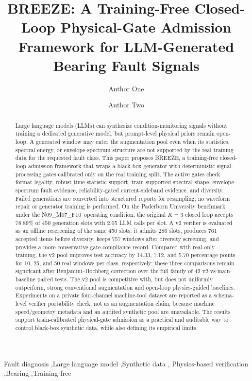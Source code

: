 \documentclass[review,3p,times]{elsarticle}
\newcommand{\breeze}{BREEZE}
\newcommand{\pucond}{N09\_M07\_F10}
\begin{document}
\begin{frontmatter}

\title{\breeze: A Training-Free Closed-Loop Physical-Gate Admission Framework
for LLM-Generated Bearing Fault Signals}

\author[a]{Author One}
\author[a]{Author Two}

\begin{abstract}
Large language models (LLMs) can synthesize condition-monitoring signals
without training a dedicated generative model, but prompt-level physical priors
remain open-loop. A generated window may enter the augmentation pool even when
its statistics, spectral energy, or envelope-spectrum structure are not
supported by the real training data for the requested fault class. This paper
proposes \breeze, a training-free closed-loop admission framework that wraps a
black-box generator with deterministic signal-processing gates calibrated only
on the real training split. The active gates check format legality, robust
time-statistic support, train-supported spectral shape, envelope-spectrum fault
evidence, reliability-gated current-sideband evidence, and diversity. Failed
generations are converted into structured reports for resampling; no waveform
repair or generator training is performed. On the Paderborn University
benchmark under the \pucond\ operating condition, the original $K{=}3$ closed
loop accepts 78.89\% of 450 generation slots with 2.05 LLM calls per slot. A
v2 verifier is evaluated as an offline rescreening of the same 450 slots: it
admits 286 slots, produces 761 accepted items before diversity, keeps 757
windows after diversity screening, and provides a more conservative
gate-compliance record. Compared with real-only training,
the v2 pool improves test accuracy by 14.33, 7.12, and 5.70 percentage points
for 10, 25, and 50 real windows per class, respectively; these three
comparisons remain significant after Benjamini--Hochberg correction over the
full family of 42 v2-vs-main-baseline paired tests. The v2 pool is competitive with, but does not uniformly
outperform, strong conventional augmentation and open-loop physics-guided
baselines. Experiments on a private four-channel machine-tool dataset are
reported as a schema-level verifier portability check, not as an augmentation
claim, because machine speed/geometry metadata and an audited synthetic pool
are unavailable. The results support train-calibrated physical-gate admission
as a practical and auditable way to control black-box synthetic data, while
also defining its empirical limits.
\end{abstract}

\begin{keyword}
Fault diagnosis \sep Large language model \sep Synthetic data \sep
Physics-based verification \sep Bearing \sep Training-free
\end{keyword}
\end{frontmatter}
\end{document}
